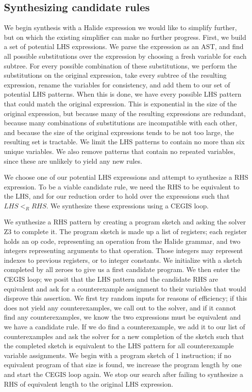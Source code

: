 \documentclass[sigplan,review,anonymous]{acmart}\settopmatter{printfolios=true,printccs=false,printacmref=false}
\begin{document}
\subsection{Synthesizing candidate rules}

We begin synthesis with a Halide expression we would like to simplify further, but on which the existing simplifier can make no further progress. First, we build a set of potential LHS expressions. We parse the expression as an AST, and find all possible substitutions over the expression by choosing a fresh variable for each subtree. For every possible combination of these substitutions, we perform the substitutions on the original expression, take every subtree of the resulting expression, rename the variables for consistency, and add them to our set of potential LHS patterns. When this is done, we have every possible LHS pattern that could match the original expression. This is exponential in the size of the original expression, but because many of the resulting expressions are redundant, because many combinations of substitutions are incompatible with each other, and because the size of the original expressions tends to be not too large, the resulting set is tractable. We limit the LHS patterns to contain no more than six unique variables. We also remove patterns that contain no repeated variables, since these are unlikely to yield any new rules.

We choose one of our potential LHS expressions and attempt to synthesize a RHS expression. To be a viable candidate rule, we need the RHS to be equivalent to the LHS, and for our reduction order to hold over the expressions such that $LHS <_R RHS$. We synthesize these expressions using a CEGIS loop.

We synthesize a RHS pattern by creating a program sketch and asking the solver Z3 to complete it. The program sketch is made up a list of registers; each register holds an op code, representing an operation from the Halide grammar, and two integers representing arguments to that operation. Those integers may represent indexes to previous registers, or to integer constants. We initialize with a sketch completed by all zeroes to give us a first candidate program. We then enter the CEGIS loop; we posit that the LHS pattern and the candidate RHS are equivalent and ask for a counterexample assignment to their variables that would disprove this assertion. We first try random inputs for reasons of efficiency; if this does not yield any counterexamples, we call out to the solver, and if it cannot find any counterexamples, we know the two expressions must be equivalent and we have a candidate rule. If we do find a counterexample, we add it to our list of counterexamples and ask the solver for a new completion of the sketch such that the completed sketch is equivalent to the LHS pattern for all counterexample variable assignments. We begin with a program sketch of 1 instruction; if no equivalent program of that size is found, we increase the program length by one and start the CEGIS loop again. We stop our search after failing to synthesize a RHS of equivalent length to the original LHS expression.
\end{document}
